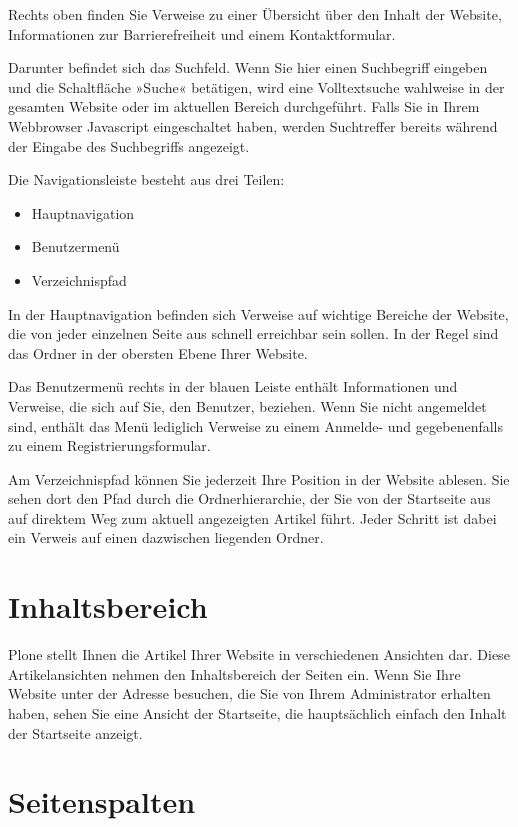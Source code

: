 \documentclass[a4paper,12pt,ngerman]{manual}
\begin{document}
Rechts oben finden Sie Verweise zu einer Übersicht über den Inhalt der
Website, Informationen zur Barrierefreiheit und einem Kontaktformular.

Darunter befindet sich das Suchfeld. Wenn Sie hier einen Suchbegriff eingeben
und die Schaltfläche »Suche« betätigen, wird eine Volltextsuche wahlweise in
der gesamten Website oder im aktuellen Bereich durchgeführt. Falls
Sie in Ihrem Webbrowser Javascript eingeschaltet haben, werden Suchtreffer
bereits während der Eingabe des Suchbegriffs angezeigt.

Die Navigationsleiste besteht aus drei Teilen:
\begin{itemize}
\item {} 
Hauptnavigation

\item {} 
Benutzermenü

\item {} 
Verzeichnispfad

\end{itemize}

In der Hauptnavigation befinden sich Verweise auf wichtige Bereiche der
Website, die von jeder einzelnen Seite aus schnell erreichbar sein sollen. In
der Regel sind das Ordner in der obersten Ebene Ihrer Website.

Das Benutzermenü rechts in der blauen Leiste enthält Informationen und
Verweise, die sich auf Sie, den Benutzer, beziehen. Wenn Sie nicht angemeldet
sind, enthält das Menü lediglich Verweise zu einem Anmelde- und gegebenenfalls
zu einem Registrierungsformular.

Am Verzeichnispfad können Sie jederzeit Ihre Position in der Website ablesen.
Sie sehen dort den Pfad durch die Ordnerhierarchie, der Sie von der Startseite
aus auf direktem Weg zum aktuell angezeigten Artikel führt.  Jeder Schritt ist
dabei ein Verweis auf einen dazwischen liegenden Ordner.


\section{Inhaltsbereich}

Plone stellt Ihnen die Artikel Ihrer Website in verschiedenen Ansichten dar.
Diese Artikelansichten nehmen den Inhaltsbereich der Seiten ein. Wenn Sie Ihre
Website unter der Adresse besuchen, die Sie von Ihrem Administrator erhalten
haben, sehen Sie eine Ansicht der Startseite, die hauptsächlich einfach den
Inhalt der Startseite anzeigt.


\section{Seitenspalten}
\end{document}
